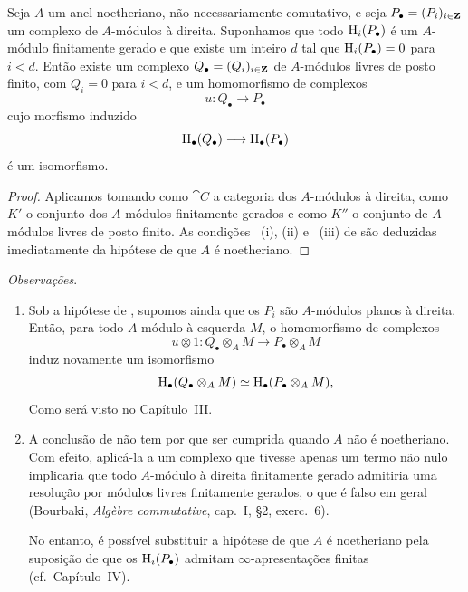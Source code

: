 \begin{corollary}[11.9.2]
\label{0.11.9.2}
Seja $A$ um anel noetheriano, não necessariamente comutativo, e seja
$P_\bullet=(P_i)_{i\in\mathbf{Z}}$ um complexo de $A$-módulos à direita.
Suponhamos que todo $\mathrm{H}_i(P_\bullet)$ é um $A$-módulo finitamente
gerado e que existe um inteiro $d$ tal que
$\mathrm{H}_i(P_\bullet)=0$ para $i<d$.
Então existe um complexo $Q_\bullet=(Q_i)_{i\in\mathbf{Z}}$ de
$A$-módulos livres de posto finito, com $Q_i=0$ para $i<d$, e um homomorfismo
de complexos
\[
  u:Q_\bullet\longrightarrow P_\bullet
\]
cujo morfismo induzido
\[
  \mathrm{H}_\bullet(Q_\bullet)\longrightarrow\mathrm{H}_\bullet(P_\bullet)
\]
é um isomorfismo.
\end{corollary}

\begin{proof}
Aplicamos  tomando como $\cat{C}$ a categoria dos
$A$-módulos à direita, como $K'$ o conjunto dos $A$-módulos finitamente gerados e
como $K''$ o conjunto de $A$-módulos livres de posto finito.
As condições ~(i), (ii) e ~(iii) de  são deduzidas imediatamente
da hipótese de que $A$ é noetheriano.
\end{proof}

\begin{env}[11.9.3]
\label{0.11.9.3}
\emph{Observações}.
\begin{enumerate}
  \item[{\rm(i)}]
  Sob a hipótese de , supomos ainda que os
  $P_i$ são $A$-módulos planos à direita.
  Então, para todo $A$-módulo à esquerda $M$, o homomorfismo de complexos
  \[
    u\otimes 1:
    Q_\bullet\otimes_A M
    \longrightarrow
    P_\bullet\otimes_A M
  \]
  induz novamente um isomorfismo
  \[
    \mathrm{H}_\bullet(Q_\bullet\otimes_A M)
    \simeq
    \mathrm{H}_\bullet(P_\bullet\otimes_A M),
  \]
  Como será visto no Capítulo~III.

  \item[{\rm(ii)}]
  A conclusão de  não tem por que ser cumprida quando $A$ não é
  noetheriano.
  Com efeito, aplicá-la a um complexo que tivesse apenas um termo não nulo
  implicaria que todo $A$-módulo à direita finitamente gerado admitiria uma resolução por
  módulos livres finitamente gerados, o que é falso em geral
(Bourbaki, \emph{Alg\`ebre commutative}, cap.~I, \S2, exerc.~6).

  No entanto, é possível substituir a hipótese de que $A$ é
  noetheriano pela suposição de que os $\mathrm{H}_i(P_\bullet)$ admitam
  $\infty$-apresentações finitas (cf.\ Capítulo~IV).
\end{enumerate}
\end{env}


